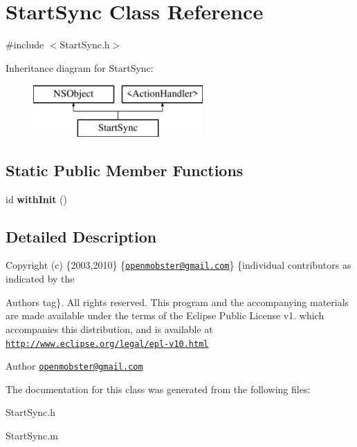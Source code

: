 \hypertarget{interface_start_sync}{
\section{\-Start\-Sync \-Class \-Reference}
\label{interface_start_sync}
}


{\ttfamily \#include $<$\-Start\-Sync.\-h$>$}

\-Inheritance diagram for \-Start\-Sync\-:\begin{figure}[H]
\begin{center}
\leavevmode
\includegraphics[height=2.000000cm]{interface_start_sync}
\end{center}
\end{figure}
\subsection*{\-Static \-Public \-Member \-Functions}
\begin{DoxyCompactItemize}
\item 
\hypertarget{interface_start_sync_af805d5288b7622ed16a8369f8c0301da}{
id {\bfseries with\-Init} ()}
\label{interface_start_sync_af805d5288b7622ed16a8369f8c0301da}

\end{DoxyCompactItemize}


\subsection{\-Detailed \-Description}
\-Copyright (c) \{2003,2010\} \{\href{mailto:openmobster@gmail.com}{\tt openmobster@gmail.\-com}\} \{individual contributors as indicated by the \begin{DoxyAuthor}{\-Authors}
tag\}. \-All rights reserved. \-This program and the accompanying materials are made available under the terms of the \-Eclipse \-Public \-License v1. which accompanies this distribution, and is available at \href{http://www.eclipse.org/legal/epl-v10.html}{\tt http\-://www.\-eclipse.\-org/legal/epl-\/v10.\-html}
\end{DoxyAuthor}
\begin{DoxyAuthor}{\-Author}
\href{mailto:openmobster@gmail.com}{\tt openmobster@gmail.\-com} 
\end{DoxyAuthor}


\-The documentation for this class was generated from the following files\-:\begin{DoxyCompactItemize}
\item 
\-Start\-Sync.\-h\item 
\-Start\-Sync.\-m\end{DoxyCompactItemize}
